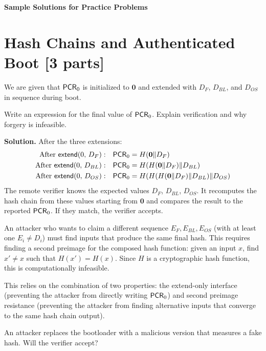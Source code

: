 \documentclass[11pt]{article}
\newcommand{\pcr}[1]{\ms{PCR}_{#1}}
\newcommand{\extend}[2]{\ms{extend}(#1,\, #2)}
\begin{document}
\maketitle

\noindent\textbf{Sample Solutions for Practice Problems}

\section*{Hash Chains and Authenticated Boot [3 parts]}

We are given that $\pcr{0}$ is initialized to $\mathbf{0}$ and
extended with $D_F$, $D_{BL}$, and $D_{OS}$ in sequence during boot.

\begin{task}\rm
  Write an expression for the final value of $\pcr{0}$.  Explain
  verification and why forgery is infeasible.
\end{task}

\noindent\textbf{Solution.}
After the three extensions:
\begin{align*}
  \text{After } \extend{0}{D_F}: \quad
    & \pcr{0} = H(\mathbf{0} \| D_F) \\
  \text{After } \extend{0}{D_{BL}}: \quad
    & \pcr{0} = H(H(\mathbf{0} \| D_F) \| D_{BL}) \\
  \text{After } \extend{0}{D_{OS}}: \quad
    & \pcr{0} = H(H(H(\mathbf{0} \| D_F) \| D_{BL}) \| D_{OS})
\end{align*}
The remote verifier knows the expected values $D_F$, $D_{BL}$, $D_{OS}$.
It recomputes the hash chain from these values starting from $\mathbf{0}$
and compares the result to the reported $\pcr{0}$.  If they match, the
verifier accepts.

An attacker who wants to claim a different sequence $E_F, E_{BL}, E_{OS}$
(with at least one $E_i \neq D_i$) must find inputs that produce the same
final hash.  This requires finding a second preimage for the composed hash
function: given an input $x$, find $x' \neq x$ such that $H(x') = H(x)$.
Since $H$ is a cryptographic hash function, this is computationally
infeasible.

This relies on the combination of two properties: the extend-only
interface (preventing the attacker from directly writing $\pcr{0}$) and
second preimage resistance (preventing the attacker from finding
alternative inputs that converge to the same hash chain output).

\begin{task}\rm
  An attacker replaces the bootloader with a malicious version that
  measures a fake hash.  Will the verifier accept?
\end{task}
\end{document}
